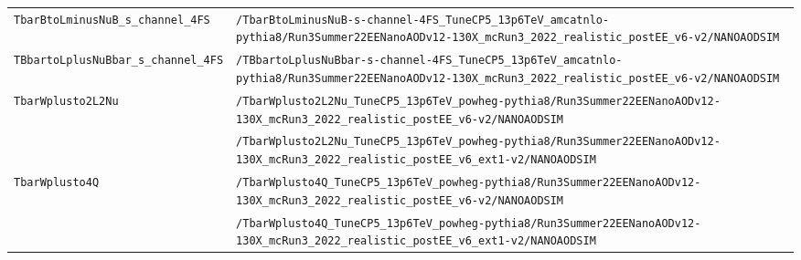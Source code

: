 \begin{longtable}{@{}>{\RaggedRight\arraybackslash}p{} >{\RaggedRight\arraybackslash}p{}@{}}
\addlinespace[2pt]
\texttt{TbarBtoLminusNuB\_\allowbreak{}s\_\allowbreak{}channel\_\allowbreak{}4FS} & \texttt{/\allowbreak{}TbarBtoLminusNuB-\allowbreak{}s-\allowbreak{}channel-\allowbreak{}4FS\_\allowbreak{}TuneCP5\_\allowbreak{}13p6TeV\_\allowbreak{}amcatnlo-\allowbreak{}pythia8/\allowbreak{}Run3Summer22EENanoAODv12-\allowbreak{}130X\_\allowbreak{}mcRun3\_\allowbreak{}2022\_\allowbreak{}realistic\_\allowbreak{}postEE\_\allowbreak{}v6-\allowbreak{}v2/\allowbreak{}NANOAODSIM} \\
\addlinespace[2pt]
\texttt{TBbartoLplusNuBbar\_\allowbreak{}s\_\allowbreak{}channel\_\allowbreak{}4FS} & \texttt{/\allowbreak{}TBbartoLplusNuBbar-\allowbreak{}s-\allowbreak{}channel-\allowbreak{}4FS\_\allowbreak{}TuneCP5\_\allowbreak{}13p6TeV\_\allowbreak{}amcatnlo-\allowbreak{}pythia8/\allowbreak{}Run3Summer22EENanoAODv12-\allowbreak{}130X\_\allowbreak{}mcRun3\_\allowbreak{}2022\_\allowbreak{}realistic\_\allowbreak{}postEE\_\allowbreak{}v6-\allowbreak{}v2/\allowbreak{}NANOAODSIM} \\
\addlinespace[2pt]
\texttt{TbarWplusto2L2Nu} & \texttt{/\allowbreak{}TbarWplusto2L2Nu\_\allowbreak{}TuneCP5\_\allowbreak{}13p6TeV\_\allowbreak{}powheg-\allowbreak{}pythia8/\allowbreak{}Run3Summer22EENanoAODv12-\allowbreak{}130X\_\allowbreak{}mcRun3\_\allowbreak{}2022\_\allowbreak{}realistic\_\allowbreak{}postEE\_\allowbreak{}v6-\allowbreak{}v2/\allowbreak{}NANOAODSIM} \\
 & \texttt{/\allowbreak{}TbarWplusto2L2Nu\_\allowbreak{}TuneCP5\_\allowbreak{}13p6TeV\_\allowbreak{}powheg-\allowbreak{}pythia8/\allowbreak{}Run3Summer22EENanoAODv12-\allowbreak{}130X\_\allowbreak{}mcRun3\_\allowbreak{}2022\_\allowbreak{}realistic\_\allowbreak{}postEE\_\allowbreak{}v6\_\allowbreak{}ext1-\allowbreak{}v2/\allowbreak{}NANOAODSIM} \\
\addlinespace[2pt]
\texttt{TbarWplusto4Q} & \texttt{/\allowbreak{}TbarWplusto4Q\_\allowbreak{}TuneCP5\_\allowbreak{}13p6TeV\_\allowbreak{}powheg-\allowbreak{}pythia8/\allowbreak{}Run3Summer22EENanoAODv12-\allowbreak{}130X\_\allowbreak{}mcRun3\_\allowbreak{}2022\_\allowbreak{}realistic\_\allowbreak{}postEE\_\allowbreak{}v6-\allowbreak{}v2/\allowbreak{}NANOAODSIM} \\
 & \texttt{/\allowbreak{}TbarWplusto4Q\_\allowbreak{}TuneCP5\_\allowbreak{}13p6TeV\_\allowbreak{}powheg-\allowbreak{}pythia8/\allowbreak{}Run3Summer22EENanoAODv12-\allowbreak{}130X\_\allowbreak{}mcRun3\_\allowbreak{}2022\_\allowbreak{}realistic\_\allowbreak{}postEE\_\allowbreak{}v6\_\allowbreak{}ext1-\allowbreak{}v2/\allowbreak{}NANOAODSIM} \\

\end{longtable}
